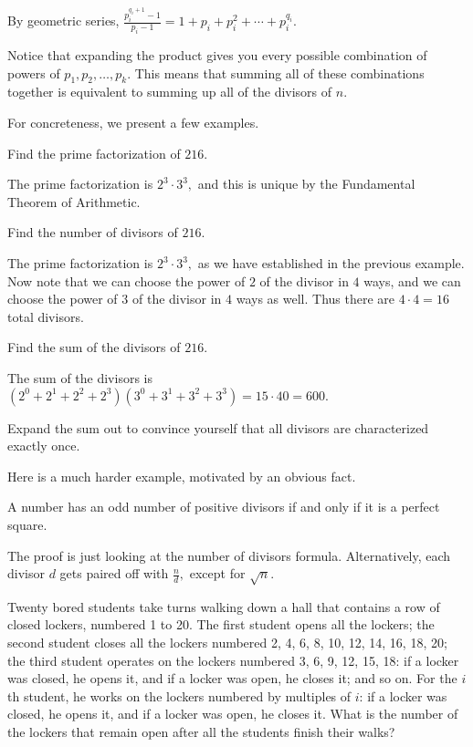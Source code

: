 \documentclass[blue,onecol]{shooting}
\begin{document}
\begin{pro}
By geometric series, $\frac{p_i^{q_i+1}-1}{p_i-1}=1+p_i+p_i^2+\cdots+p_i^{q_i}.$

Notice that expanding the product gives you every possible combination of powers of $p_1,p_2,\ldots,p_k.$ This means that summing all of these combinations together is equivalent to summing up all of the divisors of $n.$
\end{pro}

For concreteness, we present a few examples.
\begin{exam}
Find the prime factorization of $216.$
\end{exam}
\begin{sol}
The prime factorization is $2^3\cdot 3^3,$ and this is unique by the Fundamental Theorem of Arithmetic.
\end{sol}
\begin{exam}
Find the number of divisors of $216.$
\end{exam}
\begin{sol}
The prime factorization is $2^3\cdot 3^3,$ as we have established in the previous example. Now note that we can choose the power of $2$ of the divisor in $4$ ways, and we can choose the power of $3$ of the divisor in $4$ ways as well. Thus there are $4\cdot 4=16$ total divisors.
\end{sol}
\begin{exam}
Find the sum of the divisors of $216.$
\end{exam}
\begin{sol}
The sum of the divisors is $(2^0+2^1+2^2+2^3)(3^0+3^1+3^2+3^3)=15\cdot 40=600.$

Expand the sum out to convince yourself that all divisors are characterized exactly once.
\end{sol}
Here is a much harder example, motivated by an obvious fact.
\begin{fact}
A number has an odd number of positive divisors if and only if it is a perfect square.
\end{fact}
The proof is just looking at the number of divisors formula. Alternatively, each divisor $d$ gets paired off with $\frac{n}{d},$ except for $\sqrt{n}.$

\begin{exam}[104 NT]
Twenty bored students take turns walking down a hall that contains a row of closed lockers, numbered 1 to 20. The first student opens all the lockers; the second student closes all the lockers numbered 2, 4, 6, 8, 10, 12, 14, 16, 18, 20; the third student operates on the lockers numbered 3, 6, 9, 12, 15, 18: if a locker was closed, he opens it, and if a locker was open, he closes it; and so on. For the $i$th student, he works on the lockers numbered by multiples of $i$: if a locker was closed, he opens it, and if a locker was open, he closes it. What is the number of the lockers that remain open after all the students finish their walks?
\end{exam}
\end{document}
